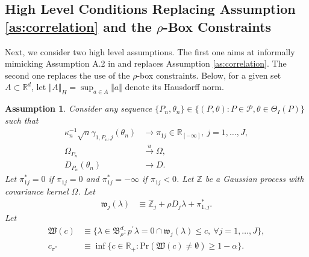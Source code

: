 \documentclass[letterpaper,11pt]{article}
\theoremstyle{myplain}
\theoremstyle{mydefinition}
\newtheorem{assumption}{Assumption}[section]
\theoremstyle{myremark}
\renewcommand{\cite}{\citet}
\newcommand{\uni}{\stackrel{u}{\rightarrow}}
\newcommand{\HH}{\mathbb{Z}}
\newcommand{\R}{\mathbb{R}}
\newcommand{\cP}{\mathcal{P}}
\numberwithin{equation}{section}
\numberwithin{figure}{section}
\begin{document}
\begin{appendices}
\subsection{High Level Conditions Replacing Assumption \ref{as:correlation} and the $\rho$-Box Constraints}
\label{sec:alt:ass:eig}
Next, we consider two high level assumptions. The first one aims at informally mimicking Assumption A.2 in \cite{BCS14_subv} and replaces Assumption \ref{as:correlation}. The second one replaces the use of the $\rho$-box constraints. Below, for a given set $A \subset \R^d$, let $\Vert A \Vert_H=\sup_{a \in A}\Vert a \Vert$ denote its Hausdorff norm.
\begin{assumption}
\label{ass:continuity_limit_cov}
Consider any sequence $\{P_n,\theta_n\} \in \{(P,\theta):P \in \cP,\theta \in \Theta_I(P)\}$ such that 
\begin{align*}
\kappa_n^{-1}\sqrt{n}\gamma_{1,P_n,j}(\theta_n) &\to \pi_{1j} \in \R_{[-\infty]},~j=1,\dots,J,\\
\Omega_{P_n} &\uni \Omega,\\
D_{P_n}(\theta_n) &\to D.

\end{align*}
Let $\pi^*_{1j}=0$ if $\pi_{1j} = 0$ and $\pi^*_{1j}=-\infty$ if $\pi_{1j} < 0$. Let $\HH$ be a Gaussian process with covariance kernel $\Omega$. Let
\begin{align}
\mathfrak{w}_{j}(\lambda)&\equiv \HH_{j}+\rho D_{j}\lambda+\pi^*_{1,j}.\label{eq:wj_var}
\end{align}
Let
\begin{align}
\mathfrak{W}(c)&\equiv \big\{ \lambda\in \mathfrak B^d_\rho: p^\prime \lambda = 0 \cap \mathfrak w_{j}(\lambda)\le c, \: \forall j=1,\dots,J\big\} \label{eq:set_W_Lpop_var},\\
c_{\pi^*}&\equiv \inf\{c\in\mathbb R_+:\mathrm{Pr}(\mathfrak{W}(c)\ne\emptyset)\ge 1-\alpha\}.\label{eq:def:c_pi_star}
\end{align}






\end{assumption}
\end{appendices}
\end{document}
